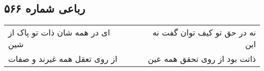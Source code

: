 \begin{center}
\section*{رباعی شماره ۵۶۶}
\label{sec:sh566}
\begin{longtable}{l p{0.5cm} r}
ای در همه شان ذات تو پاک از شین
&&
نه در حق تو کیف توان گفت نه این
\\
از روی تعقل همه غیرند و صفات
&&
ذاتت بود از روی تحقق همه عین
\\
\end{longtable}
\end{center}
